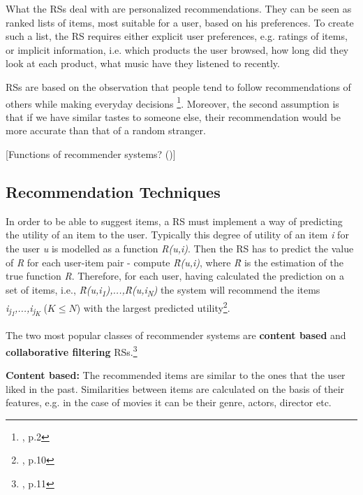 \documentclass[12pt]{report}
\begin{document}
What the RSs deal with are personalized recommendations. They can be seen as ranked lists of items, most suitable for a user, based on his preferences. To create such a list, the RS requires either explicit user preferences, e.g. ratings of items, or implicit information, i.e. which products the user browsed, how long did they look at each product, what music have they listened to recently.

RSs are based on the observation that people tend to follow recommendations of others while making everyday decisions \footnote{\cite{rec_sys_handbook}, p.2}. Moreover, the second assumption is that if we have similar tastes to someone else, their recommendation would be more accurate than that of a random stranger.

[Functions of recommender systems? (\cite{rec_sys_handbook})]

\subsection{Recommendation Techniques}

In order to be able to suggest items, a RS must implement a way of predicting the utility of an item to the user. Typically this degree of utility of an item \textit{i} for the user \textit{u} is modelled as a function \textit{R(u,i)}. Then the RS has to predict the value of \textit{R} for each user-item pair - compute \textit{\^{R}(u,i)}, where \textit{\^{R}} is the estimation of the true function \textit{R}. Therefore, for each user, having calculated the prediction on a set of items, i.e., \textit{\^{R}(u,i\textsubscript{1}),...,\^{R}(u,i\textsubscript{N})} the system will recommend the items \textit{i\textsubscript{j\textsubscript{1}},...,i\textsubscript{j\textsubscript{K}}} ($K \leq N$) with the largest predicted utility\footnote{\cite{rec_sys_handbook}, p.10}.

The two most popular classes of recommender systems are {\bf content based} and {\bf collaborative filtering} RSs.\footnote{\cite{rec_sys_handbook}, p.11}

\hbox{}
{\bf Content based:} The recommended items are similar to the ones that the user liked in the past. Similarities between items are calculated on the basis of their features, e.g. in the case of movies it can be their genre, actors, director etc.
\end{document}
